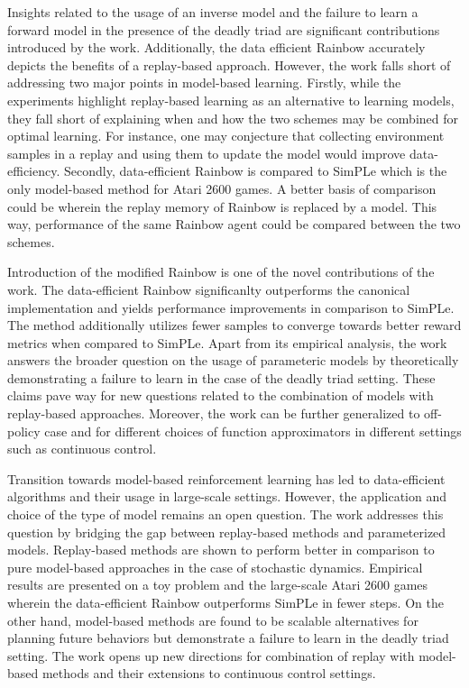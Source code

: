 \documentclass[10pt,letterpaper]{article}
\begin{document}
Insights related to the usage of an inverse model and the failure to learn a forward model in the presence of the deadly triad are significant contributions introduced by the work. Additionally, the data efficient Rainbow accurately depicts the benefits of a replay-based approach. However, the work falls short of addressing two major points in model-based learning. Firstly, while the experiments highlight replay-based learning as an alternative to learning models, they fall short of explaining when and how the two schemes may be combined for optimal learning. For instance, one may conjecture that collecting environment samples in a replay and using them to update the model would improve data-efficiency. Secondly, data-efficient Rainbow is compared to SimPLe which is the only model-based method for Atari 2600 games. A better basis of comparison could be wherein the replay memory of Rainbow is replaced by a model. This way, performance of the same Rainbow agent could be compared between the two schemes. 

Introduction of the modified Rainbow is one of the novel contributions of the work. The data-efficient Rainbow significanlty outperforms the canonical implementation and yields performance improvements in comparison to SimPLe. The method additionally utilizes fewer samples to converge towards better reward metrics when compared to SimPLe. Apart from its empirical analysis, the work answers the broader question on the usage of parameteric models by theoretically demonstrating a failure to learn in the case of the deadly triad setting. These claims pave way for new questions related to the combination of models with replay-based approaches. Moreover, the work can be further generalized to off-policy case and for different choices of function approximators in different settings such as continuous control. 

Transition towards model-based reinforcement learning has led to data-efficient algorithms and their usage in large-scale settings. However, the application and choice of the type of model remains an open question. The work addresses this question by bridging the gap between replay-based methods and parameterized models. Replay-based methods are shown to perform better in comparison to pure model-based approaches in the case of stochastic dynamics. Empirical results are presented on a toy problem and the large-scale Atari 2600 games wherein the data-efficient Rainbow outperforms SimPLe in fewer steps. On the other hand, model-based methods are found to be scalable alternatives for planning future behaviors but demonstrate a failure to learn in the deadly triad setting. The work opens up new directions for combination of replay with model-based methods and their extensions to continuous control settings.
\end{document}

